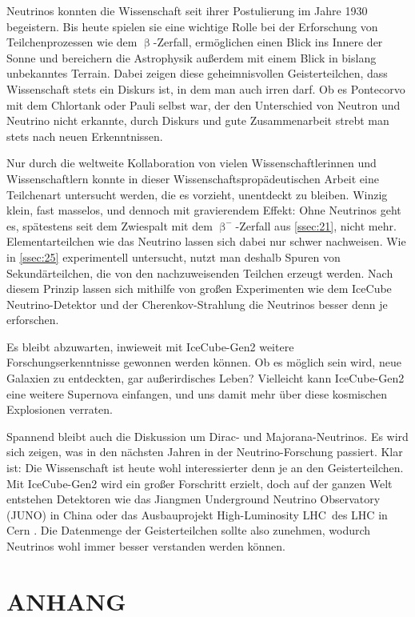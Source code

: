 \documentclass[a4paper,12pt]{article}
\begin{document}
Neutrinos konnten die Wissenschaft seit ihrer Postulierung im Jahre 1930 begeistern. Bis heute spielen sie eine wichtige Rolle bei der Erforschung von Teilchenprozessen wie dem $\upbeta$-Zerfall, ermöglichen einen Blick ins Innere der Sonne und bereichern die Astrophysik außerdem mit einem Blick in bislang unbekanntes Terrain. Dabei zeigen diese geheimnisvollen Geisterteilchen, dass Wissenschaft stets ein Diskurs ist, in dem man auch irren darf. Ob es Pontecorvo mit dem Chlortank oder Pauli selbst war, der den Unterschied von Neutron und Neutrino nicht erkannte, durch Diskurs und gute Zusammenarbeit strebt man stets nach neuen Erkenntnissen. \par
Nur durch die weltweite Kollaboration von vielen Wissenschaftlerinnen und Wissenschaftlern konnte in dieser Wissenschaftspropädeutischen Arbeit eine Teilchenart untersucht werden, die es vorzieht, unentdeckt zu bleiben. Winzig klein, fast masselos, und dennoch mit gravierendem Effekt: Ohne Neutrinos geht es, spätestens seit dem Zwiespalt mit dem $\upbeta^-$-Zerfall aus \cref{ssec:21}, nicht mehr. Elementarteilchen wie das Neutrino lassen sich dabei nur schwer nachweisen. Wie in \cref{ssec:25} experimentell untersucht, nutzt man deshalb Spuren von Sekundärteilchen, die von den nachzuweisenden Teilchen erzeugt werden. Nach diesem Prinzip lassen sich mithilfe von großen Experimenten wie dem IceCube Neutrino-Detektor und der Cherenkov-Strahlung die Neutrinos besser denn je erforschen. \par 
Es bleibt abzuwarten, inwieweit mit IceCube-Gen2 weitere Forschungserkenntnisse gewonnen werden können. Ob es möglich sein wird, neue Galaxien zu entdeckten, gar außerirdisches Leben? Vielleicht kann IceCube-Gen2 eine weitere Supernova einfangen, und uns damit mehr über diese kosmischen Explosionen verraten. \par
Spannend bleibt auch die Diskussion um Dirac- und Majorana-Neutrinos. Es wird sich zeigen, was in den nächsten Jahren in der Neutrino-Forschung passiert. Klar ist: Die Wissenschaft ist heute wohl interessierter denn je an den Geisterteilchen. Mit IceCube-Gen2 wird ein großer Forschritt erzielt, doch auf der ganzen Welt entstehen Detektoren wie das Jiangmen Underground Neutrino Observatory (JUNO) in China \cite{UniJohannesGutenbergMainz2025, JUNO2025} oder das Ausbauprojekt \glqq High-Luminosity LHC\grqq \ des LHC in Cern \cite{UniBonn2025}. Die Datenmenge der Geisterteilchen sollte also zunehmen, wodurch Neutrinos wohl immer besser verstanden werden können.

\nocite{Hu2017}

\newpage

\section{ANHANG} \label{sec:5}
\printbibliography[title=Literaturverzeichnis]

\newpage

\listoffigures

\newpage

\listoftables
\end{document}
